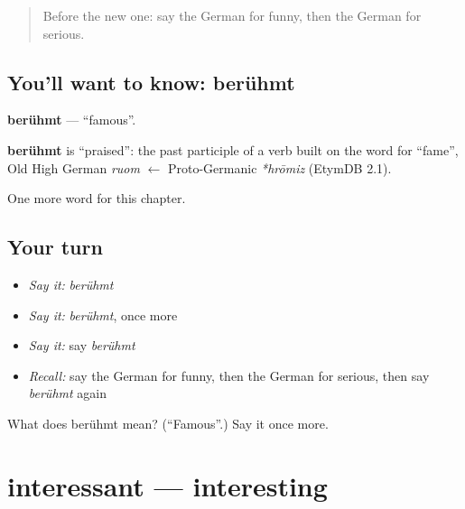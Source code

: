 \label{lesson:GE-C133-beruehmt}



\begin{quote}
Before the new one: say the German for funny, then the German for serious.
\end{quote}

\subsection*{You'll want to know: berühmt}
\textbf{berühmt} — \textquotedblleft{}famous\textquotedblright{}.

\begin{cousinweb}
\textbf{berühmt} is \textquotedblleft{}praised\textquotedblright{}: the past participle of a verb built on the word for \textquotedblleft{}fame\textquotedblright{}, Old High German \emph{ruom} $\leftarrow$ Proto-Germanic \emph{*hrōmiz} (EtymDB 2.1).
\end{cousinweb}

\begin{grammarlens}[title={What you've built}]
One more word for this chapter.
\end{grammarlens}

\subsection*{Your turn}
\begin{itemize}
\raggedright
  \item \emph{Say it:} \emph{berühmt}
  \item \emph{Say it:} \emph{berühmt}, once more
  \item \emph{Say it:} say \emph{berühmt}
  \item \emph{Recall:} say the German for funny, then the German for serious, then say \emph{berühmt} again
\end{itemize}

\begin{tcolorbox}[breakable,colback=teal!4,colframe=teal!35!black,title={Before you move on}]
What does berühmt mean? (\textquotedblleft{}Famous\textquotedblright{}.) Say it once more.
\end{tcolorbox}
\section[interessant]{interessant — interesting}

\label{lesson:GE-C133-interessant}



